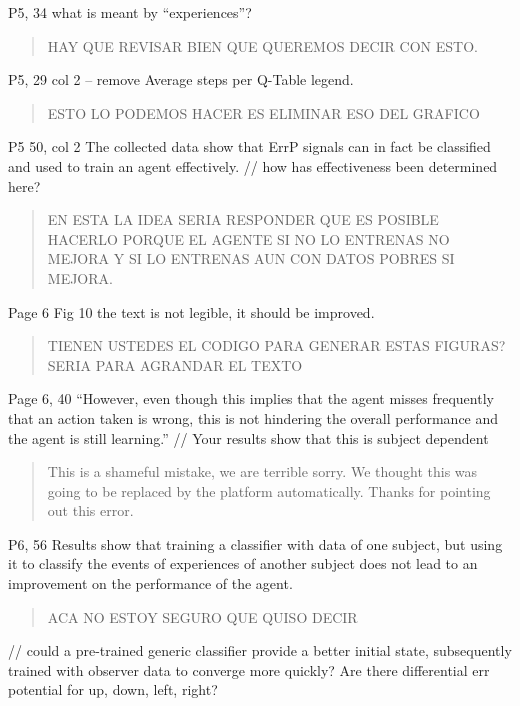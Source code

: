 \documentclass[journal,onecolumn,12pt]{IEEEtran}
\begin{document}
P5, 34 what is meant by “experiences”?

\begin{quotation}
{\color{blue}
HAY QUE REVISAR BIEN QUE QUEREMOS DECIR CON ESTO.
}
\end{quotation}

P5, 29 col 2 – remove Average steps per Q-Table legend.

\begin{quotation}
{\color{blue}
ESTO LO PODEMOS HACER ES ELIMINAR ESO DEL GRAFICO
}
\end{quotation}

P5 50, col 2 The collected data show that ErrP signals can in fact be classified and used to train an agent effectively.
// how has effectiveness been determined here?

\begin{quotation}
{\color{blue}
EN ESTA LA IDEA SERIA RESPONDER QUE ES POSIBLE HACERLO PORQUE EL AGENTE SI NO LO ENTRENAS NO MEJORA Y SI LO ENTRENAS AUN CON DATOS POBRES SI MEJORA.
}
\end{quotation}

Page 6 Fig 10 the text is not legible, it should be improved.

\begin{quotation}
{\color{blue}
TIENEN USTEDES EL CODIGO PARA GENERAR ESTAS FIGURAS?  SERIA PARA AGRANDAR EL TEXTO
}
\end{quotation}

Page 6, 40
“However, even though this implies that the agent misses frequently that an action taken is wrong, this is not hindering the overall performance and the agent is still learning.”
// Your results show that this is subject dependent

\begin{quotation}
{\color{blue}
This is a shameful mistake, we are terrible sorry.  We thought this was going to be replaced by the platform automatically. Thanks for pointing out this error.
}
\end{quotation}

P6, 56
Results show that training a classifier with data of one subject, but using it
to classify the events of experiences of another subject does
not lead to an improvement on the performance of the agent.

\begin{quotation}
{\color{blue}
ACA NO ESTOY SEGURO QUE QUISO DECIR
}
\end{quotation}


// could a pre-trained generic classifier provide a better initial state, subsequently trained with observer data to converge more quickly?
Are there differential err potential for up, down, left, right?
\end{document}
